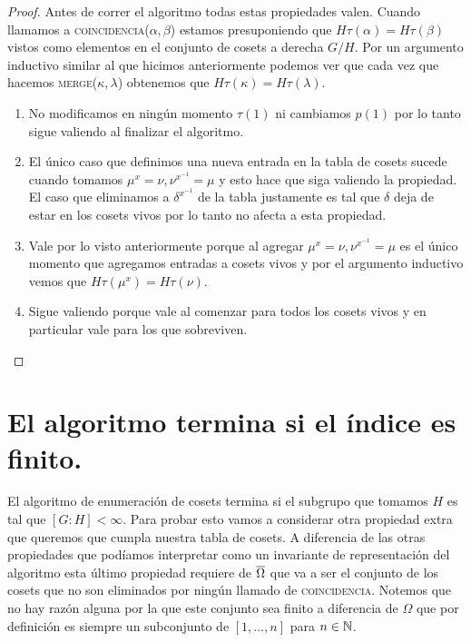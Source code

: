 \documentclass[tesis.tex]{subfiles}
\newcommand{\coin}{\textsc{coincidencia}}
\newcommand{\mer}{\textsc{merge}}
\begin{document}
\begin{proof}
	Antes de correr el algoritmo todas estas propiedades valen. 
	Cuando llamamos a \coin($\alpha, \beta$) estamos presuponiendo que $H\tau (\alpha) = H\tau(\beta)$ vistos como elementos en el conjunto de cosets a derecha $G/H$.
	Por un argumento inductivo similar al que hicimos anteriormente podemos ver que cada vez que hacemos \mer($\kappa, \lambda$) obtenemos que $H \tau (\kappa) = H \tau(\lambda)$. 
	\begin{enumerate}[P1.]
		\item No modificamos en ningún momento $\tau(1)$ ni cambiamos $p(1)$ por lo tanto sigue valiendo al finalizar el algoritmo.
		\item El único caso que definimos una nueva entrada en la tabla de cosets sucede cuando tomamos $\mu^x = \nu, \nu^{x^{-1}} = \mu$ y esto hace que siga valiendo la propiedad.
		El caso que eliminamos a $\delta^{x^{-1}}$ de la tabla justamente es tal que $\delta$ deja de estar en los cosets vivos por lo tanto no afecta a esta propiedad.
		\item Vale por lo visto anteriormente porque al agregar $\mu^x = \nu, \nu^{x^{-1}} = \mu$ es el único momento que agregamos entradas a cosets vivos y por el argumento inductivo vemos que $H\tau(\mu^x) = H\tau(\nu)$.
		\item Sigue valiendo porque vale al comenzar para todos los cosets vivos y en particular vale para los que sobreviven.
	\end{enumerate}
\end{proof}


\section{El algoritmo termina si el índice es finito.}

El algoritmo de enumeración de cosets termina si el subgrupo que tomamos $H$ es tal que $[G:H] < \infty$.
Para probar esto vamos a considerar otra propiedad extra que queremos que cumpla nuestra tabla de cosets.
A diferencia de las otras propiedades que podíamos interpretar como un invariante de representación del algoritmo esta último propiedad requiere de $ \overline \Omega$ que va a ser el conjunto de los cosets que no son eliminados por ningún llamado de \coin.
Notemos que no hay razón alguna por la que este conjunto sea finito a diferencia de $\Omega$ que por definición es siempre un subconjunto de $[1, \dots, n]$ para $n \in \mathbb{N}$.
\end{document}
